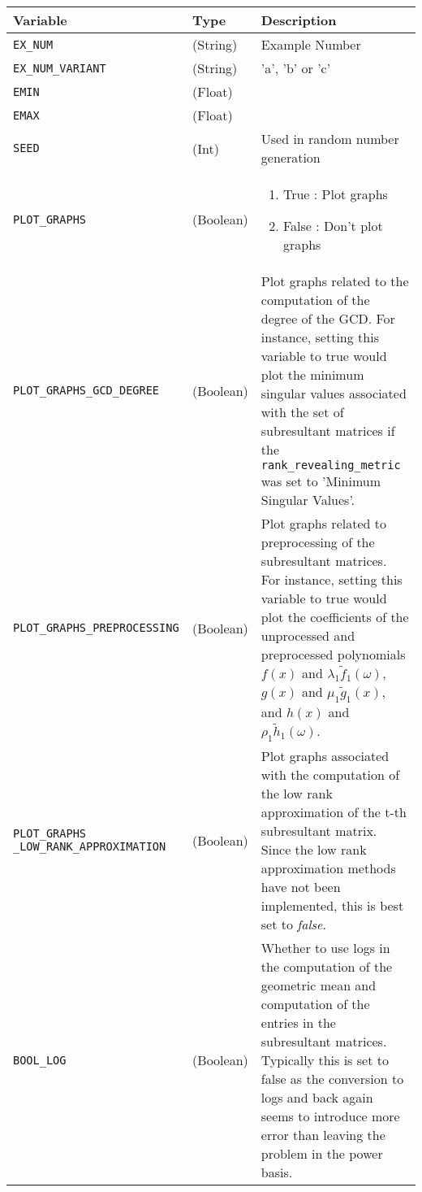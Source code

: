 \documentclass{article}
\begin{document}
\begin{longtable}[c]{|p{14em}||p{5em}|p{25em}|}
		\hline
		Variable
	&	Type
	&	Description
	\\
		\hline
		\texttt{EX\_NUM}
	&	(String)
	&	Example Number
	\\
		\hline
		\texttt{EX\_NUM\_VARIANT}
	&	(String)
	&	'a', 'b' or 'c'
	\\
		\hline
		\texttt{EMIN}
	&	(Float)
	&
	\\
		\hline
		\texttt{EMAX}
	&	(Float)
	&
	\\
		\hline
		\texttt{SEED}
	&	(Int)
	&	Used in random number generation
	\\
		\hline
		\texttt{PLOT\_GRAPHS} 
	&	(Boolean) 
	&	\begin{enumerate}
			\item True : Plot graphs
			\item False : Don't plot graphs
		\end{enumerate}
	\\
	\hline
		\texttt{PLOT\_GRAPHS\_GCD\_DEGREE}
	&	(Boolean)
	&	Plot graphs related to the computation of the degree of the \gls{GCD}. For instance, setting this variable to true would plot the minimum singular values associated with the set of subresultant matrices if the \texttt{rank\_revealing\_metric} was set to 'Minimum Singular Values'.
	\\
	\hline
	\texttt{PLOT\_GRAPHS\_PREPROCESSING}
	&	(Boolean)
	&	Plot graphs related to preprocessing of the subresultant matrices. For instance, setting this variable to true would plot the coefficients of the unprocessed and preprocessed polynomials 
	$f(x)$ 
	and 
	$\lambda_{1}\tilde{f}_{1}(\omega)$, 
	$g(x)$ 
	and 
	$\mu_{1}\tilde{g}_{1}(x)$, and 
	$h(x)$ and 
	$\rho_{1}\tilde{h}_{1}(\omega)$.
	\\	
	
	
	
	\hline
	\texttt{PLOT\_GRAPHS \_LOW\_RANK\_APPROXIMATION}
	&	(Boolean)
	&	Plot graphs associated with the computation of the low rank approximation of the t-th subresultant matrix. Since the low rank approximation methods have not been implemented, this is best set to \textit{false}.
	\\
	
	
	
	
	
	
		\hline
		\texttt{BOOL\_LOG} 
	&	(Boolean) 
	&	Whether to use logs in the computation of the geometric mean and computation of the entries in the subresultant matrices. Typically this is set to false as the conversion to logs and back again seems to introduce more error than leaving the problem in the power basis.
	

\end{longtable}
\end{document}
